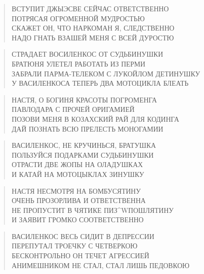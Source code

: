 \poemtitle{***}
\begin{verse}
ВСТУПИТ ДЖЫЭСВЕ СЕЙЧАС ОТВЕТСТВЕННО\\
ПОТРЯСАЯ ОГРОМЕННОЙ МУДРОСТЬЮ\\
СКАЖЕТ ОН, ЧТО НАРКОМАН Я, СЛЕДСТВЕННО\\
НАДО ГНАТЬ ВЗАШЕЙ МЕНЯ С ВСЕЙ ДУРОСТЮ
\end{verse}

\poemtitle{***}
\begin{verse}
СТРАДАЕТ ВОСИЛЕНКОС ОТ СУДЬБИНУШКИ\\
БРАТЮНЯ УЛЕТЕЛ РАБОТАТЬ ИЗ ПЕРМИ\\
ЗАБРАЛИ ПАРМА-ТЕЛЕКОМ С ЛУКОЙЛОМ ДЕТИНУШКУ\\
У ВАСИЛЕНКОСА ТЕПЕРЬ ДВА МОТОЦИКЛА БЛЕАТЬ
\end{verse}

\poemtitle{***}
\begin{verse}
НАСТЯ, О БОГИНЯ КРАСОТЫ ПОГРОМЕНГА\\
ПАВЛОДАРА С ПРОЧЕЙ ОРИГАМИЕЙ\\
ПОЗОВИ МЕНЯ В КОЗАХСКИЙ РАЙ ДЛЯ КОДИНГА\\
ДАЙ ПОЗНАТЬ ВСЮ ПРЕЛЕСТЬ МОНОГАМИИ
\end{verse}

\poemtitle{***}
\begin{verse}
ВАСИЛЕНКОС, НЕ КРУЧИНЬСЯ, БРАТУШКА\\
ПОЛЬЗУЙСЯ ПОДАРКАМИ СУДЬБИНУШКИ\\
ОТРАСТИ ДВЕ ЖОПЫ НА ОЛАДУШКАХ\\
И КАТАЙ НА МОТОЦЫКЛАХ ЗИНУШКУ
\end{verse}

\poemtitle{***}
\begin{verse}
НАСТЯ НЕСМОТРЯ НА БОМБУСЯТИНУ\\
ОЧЕНЬ ПРОЗОРЛИВА И ОТВЕТСТВЕННА\\
НЕ ПРОПУСТИТ В ЧЯТИКЕ ПИЗ^WПОШЛЯТИНУ\\
И ЗАЯВИТ ГРОМКО СООТВЕТСТВЕННО
\end{verse}

\poemtitle{***}
\begin{verse}
ВАСИЛЕНКОС ВЕСЬ СИДИТ В ДЕПРЕССИИ\\
ПЕРЕПУТАЛ ТРОЕЧКУ С ЧЕТВЕРКОЮ\\
БЕСКОНТРОЛЬНО ОН ТЕЧЕТ АГРЕССИЕЙ\\
АНИМЕШНИКОМ НЕ СТАЛ, СТАЛ ЛИШЬ ПЕДОВКОЮ
\end{verse}


